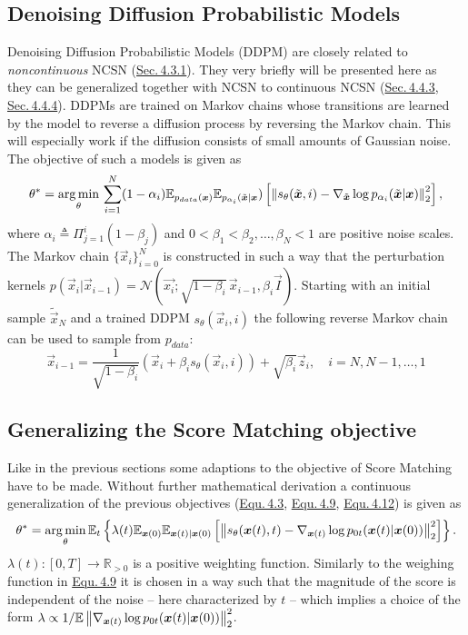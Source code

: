 \subsection{Denoising Diffusion Probabilistic Models}
Denoising Diffusion Probabilistic Models (DDPM) \cite{ho2020denoising} are closely related to \textit{noncontinuous} NCSN (\hyperref[sec:4.3.1]{Sec.\,4.3.1}). They very briefly will be presented here as they can be generalized together with NCSN to continuous NCSN (\hyperref[sec:4.4.3]{Sec.\,4.4.3}, \hyperref[sec:4.4.4]{Sec.\,4.4.4}). DDPMs are trained on Markov chains whose transitions are learned by the model to reverse a diffusion process by reversing the Markov chain. This will especially work if the diffusion consists of small amounts of Gaussian noise. The objective of such a models is given as 
%
\begin{equation} \label{equ:4.12} 
    \theta^*=\underset{\theta}{\arg\min}\,\sum_{i=1}^N(1-\alpha_i)\mathbb{E}_{p_{data}(\boldsymbol{x})}\mathbb{E}_{p_{\alpha_i}(\tilde{\boldsymbol{x}}|\boldsymbol{x}})\left[\left\lVert s_\theta(\tilde{\boldsymbol{x}},i)-\nabla_{\tilde{\boldsymbol{x}}}\log p_{\alpha_i}(\tilde{\boldsymbol{x}}|\boldsymbol{x})\right\rVert_2^2\right],
\end{equation}
%
where $\alpha_i\triangleq\Pi_{j=1}^i(1-\beta_j)$ and $0<\beta_1<\beta_2,\dots,\beta_N<1$ are positive noise scales. The Markov chain $\{\vec{x}_i\}_{i=0}^N$ is constructed in such a way that the perturbation kernels $p(\vec{x}_i|\vec{x}_{i-1})=\mathcal{N}(\vec{x_i};\sqrt{1-\beta_i}\,\vec{x}_{i-1},\beta_i\vec{I})$. Starting with an initial sample $\tilde{\vec{x}}_N$ and a trained DDPM $s_\theta(\vec{x}_i, i)$ the following reverse Markov chain can be used to sample from $p_{data}$:
%
\begin{equation} \label{equ:4.13}
    \vec{x}_{i-1}=\frac{1}{\sqrt{1-\beta_i}}(\vec{x}_i+\beta_is_\theta(\vec{x}_i,i))+\sqrt{\beta_i}\vec{z}_i,\quad i=N,N-1,\dots,1
\end{equation}
%
\subsection{Generalizing the Score Matching objective} \label{sec:4.4.3}
Like in the previous sections some adaptions to the objective of Score Matching have to be made. Without further mathematical derivation a continuous generalization of the previous objectives (\hyperref[equ:4.3]{Equ.\,4.3}, \hyperref[equ:4.9]{Equ.\,4.9}, \hyperref[equ:4.12]{Equ.\,4.12}) is given as
%
\begin{equation} \label{equ:4.14}
    \theta^*=\underset{\theta}{\arg\min}\,\mathbb{E}_t\left\{\lambda(t)\mathbb{E}_{\boldsymbol{x}(0)}\mathbb{E}_{\boldsymbol{x}(t)|\boldsymbol{x}(0)}\left[\left\lVert s_\theta(\boldsymbol{x}(t),t)-\nabla_{\boldsymbol{x}(t)}\log p_{0t}(\boldsymbol{x}(t)|\boldsymbol{x}(0))\right\rVert_2^2\right]\right\}.
\end{equation}
%
$\lambda(t):[0,T]\rightarrow\mathbb{R}_{>0}$ is a positive weighting function. Similarly to the weighing function in \hyperref[equ:4.9]{Equ.\,4.9} it is chosen in a way such that the magnitude of the score is independent of the noise – here characterized by $t$ – which implies a choice of the form $\lambda\propto 1/\mathbb{E}\left\lVert\nabla_{\boldsymbol{x}(t)}\log p_{0t}(\boldsymbol{x}(t)|\boldsymbol{x}(0))\right\rVert_2^2$.

